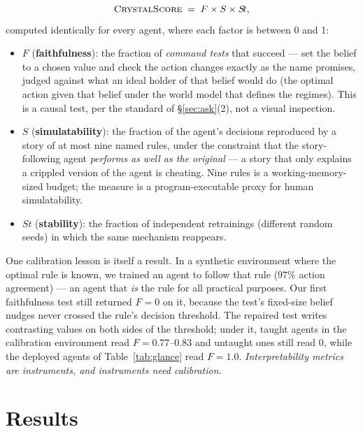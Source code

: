 \documentclass[11pt]{article}
\begin{document}
\begin{equation}
\textsc{CrystalScore} \;=\; F \times S \times S\!t,
\label{eq:cs}
\end{equation}
computed identically for every agent, where each factor is between 0 and 1:
\begin{itemize}
  \item $F$ (\textbf{faithfulness}): the fraction of \emph{command tests} that succeed --- set
        the belief to a chosen value and check the action changes exactly as the name
        promises, judged against what an ideal holder of that belief would do (the optimal
        action given that belief under the world model that defines the regimes). This is a
        causal test, per the standard of \S\ref{sec:ask}(2), not a visual inspection.
  \item $S$ (\textbf{simulatability}): the fraction of the agent's decisions reproduced by a
        story of at most nine named rules, under the constraint that the story-following agent \emph{performs as well as the
        original} --- a story that only explains a crippled version of the agent is
        cheating. Nine rules is a working-memory-sized budget; the measure is a
        program-executable proxy for human simulatability.
  \item $S\!t$ (\textbf{stability}): the fraction of independent retrainings (different
        random seeds) in which the same mechanism reappears.
\end{itemize}
One calibration lesson is itself a result. In a synthetic environment where the optimal
rule is known, we trained an agent to follow that rule ($97\%$ action agreement) --- an agent
that \emph{is} the rule for all practical purposes. Our first faithfulness test still
returned $F=0$ on it, because the test's fixed-size belief nudges never crossed the rule's
decision threshold. The repaired test writes contrasting values on both sides of the
threshold; under it, taught agents in the calibration environment read $F=0.77$--$0.83$ and
untaught ones still read $0$, while the deployed agents of Table~\ref{tab:glance} read
$F=1.0$. \emph{Interpretability metrics are instruments, and instruments need calibration.}

\section{Results}
\label{sec:results}
\end{document}

